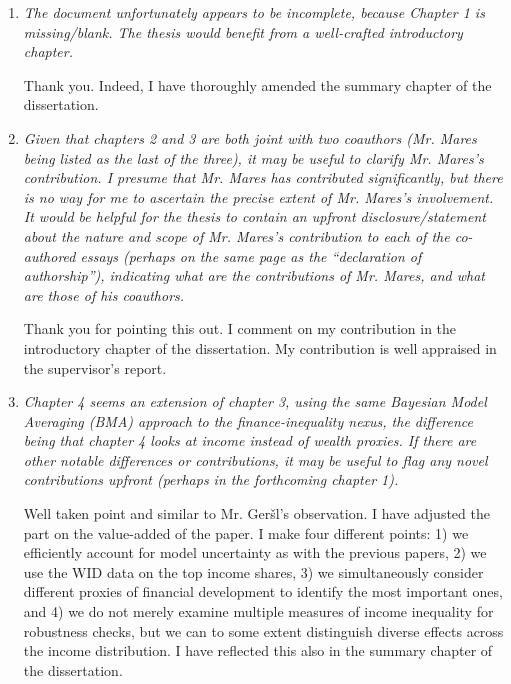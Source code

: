 \begin{enumerate}
    \item \textit{The document unfortunately appears to be incomplete, because Chapter 1 is missing/blank. The thesis would benefit from a well-crafted introductory chapter.}
    
    Thank you. Indeed, I have thoroughly amended the summary chapter of the dissertation.

    \item \textit{Given that chapters 2 and 3 are both joint with two coauthors (Mr. Mares being listed as the last of the three), it may be useful to clarify Mr. Mares's contribution. I presume that Mr. Mares has contributed significantly, but there is no way for me to ascertain the precise extent of Mr. Mares's involvement. It would be helpful for the thesis to contain an upfront disclosure/statement about the nature and scope of Mr. Mares's contribution to each of the co-authored essays (perhaps on the same page as the ``declaration of authorship''), indicating what are the contributions of Mr. Mares, and what are those of his coauthors.}
    
    Thank you for pointing this out. I comment on my contribution in the introductory chapter of the dissertation. My contribution is well appraised in the supervisor's report.

    \item \textit{Chapter 4 seems an extension of chapter 3, using the same Bayesian Model Averaging (BMA) approach to the finance-inequality nexus, the difference being that chapter 4 looks at income instead of wealth proxies. If there are other notable differences or contributions, it may be useful to flag any novel contributions upfront (perhaps in the forthcoming chapter 1).}
    
    Well taken point and similar to Mr. Ger\v{s}l's observation. I have adjusted the part on the value-added of the paper. I make four different points: 1) we efficiently account for model uncertainty as with the previous papers, 2) we use the \ac{WID} data on the top income shares, 3) we simultaneously consider different proxies of financial development to identify the most important ones, and 4) we do not merely examine multiple measures of income inequality for robustness checks, but we can to some extent distinguish diverse effects across the income distribution. I have reflected this also in the summary chapter of the dissertation.

\end{enumerate}

